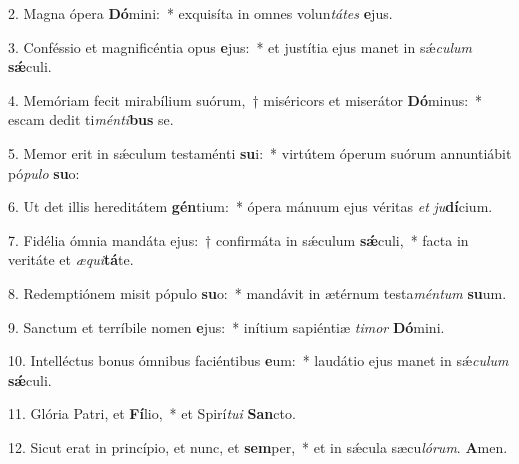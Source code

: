 \item 2. Magna ópera \textbf{Dó}mini:~* exquisíta in omnes volun\textit{tátes} \textbf{e}jus.
\item 3. Conféssio et magnificéntia opus \textbf{e}jus:~* et justítia ejus manet in sǽ\textit{culum} \textbf{sǽ}culi.
\item 4. Memóriam fecit mirabílium suórum,~† miséricors et miserátor \textbf{Dó}minus:~* escam dedit ti\textit{ménti}\textbf{bus} se.
\item 5. Memor erit in sǽculum testaménti \textbf{su}i:~* virtútem óperum suórum annuntiábit pó\textit{pulo} \textbf{su}o:
\item 6. Ut det illis hereditátem \textbf{gén}tium:~* ópera mánuum ejus véritas \textit{et} \textit{ju}\textbf{dí}cium.
\item 7. Fidélia ómnia mandáta ejus:~† confirmáta in sǽculum \textbf{sǽ}culi,~* facta in veritáte et \textit{æqui}\textbf{tá}te.
\item 8. Redemptiónem misit pópulo \textbf{su}o:~* mandávit in ætérnum testa\textit{méntum} \textbf{su}um.
\item 9. Sanctum et terríbile nomen \textbf{e}jus:~* inítium sapiéntiæ \textit{timor} \textbf{Dó}mini.
\item 10. Intelléctus bonus ómnibus faciéntibus \textbf{e}um:~* laudátio ejus manet in sǽ\textit{culum} \textbf{sǽ}culi.
\item 11. Glória Patri, et \textbf{Fí}lio,~* et Spirí\textit{tui} \textbf{San}cto.

\item 12. Sicut erat in princípio, et nunc, et \textbf{sem}per,~* et in sǽcula sæcu\textit{lórum}. \textbf{A}men.

